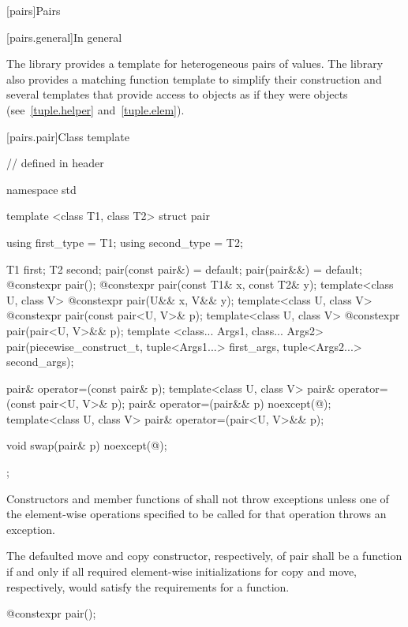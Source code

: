 [pairs]{Pairs}

[pairs.general]{In general}

\pnum
The library provides a template for heterogeneous pairs of values.
The library also provides a matching function template to simplify
their construction and several templates that provide access to 
objects as if they were  objects (see~\ref{tuple.helper}
and~\ref{tuple.elem}).%
%
%
%

[pairs.pair]{Class template }

%
\begin{codeblock}
// defined in header 

namespace std {
  template <class T1, class T2>
  struct pair {
    using first_type  = T1;
    using second_type = T2;

    T1 first;
    T2 second;
    pair(const pair&) = default;
    pair(pair&&) = default;
    @\EXPLICIT@ constexpr pair();
    @\EXPLICIT@ constexpr pair(const T1& x, const T2& y);
    template<class U, class V> @\EXPLICIT@ constexpr pair(U&& x, V&& y);
    template<class U, class V> @\EXPLICIT@ constexpr pair(const pair<U, V>& p);
    template<class U, class V> @\EXPLICIT@ constexpr pair(pair<U, V>&& p);
    template <class... Args1, class... Args2>
      pair(piecewise_construct_t,
           tuple<Args1...> first_args, tuple<Args2...> second_args);

    pair& operator=(const pair& p);
    template<class U, class V> pair& operator=(const pair<U, V>& p);
    pair& operator=(pair&& p) noexcept(@\seebelow@);
    template<class U, class V> pair& operator=(pair<U, V>&& p);

    void swap(pair& p) noexcept(@\seebelow@);
  };
}
\end{codeblock}

\pnum
Constructors and member functions of  shall not throw exceptions unless one of
the element-wise operations specified to be called for that operation
throws an exception.

\pnum
The defaulted move and copy constructor, respectively, of pair shall
be a  function if and only if all required element-wise
initializations for copy and move, respectively, would satisfy the
requirements for a  function.

%
\begin{itemdecl}
@\EXPLICIT@ constexpr pair();
\end{itemdecl}

